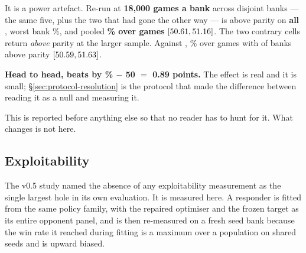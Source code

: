 It is a power artefact. Re-run at \textbf{18{,}000 games a bank} across
\vsixBigFiveBanks{} disjoint banks --- the same five, plus the two that had gone the other way ---
\vsix{} is above parity on \textbf{all \vsixBigFiveAbove{}}, worst bank \vsixBigFiveMin\%, and
pooled \textbf{\vsixBigFive\% over \vsixBigFiveN{} games}
$[50.61, 51.16]$. The two contrary cells return \emph{above} parity at the
larger sample. Against \vfour{}, \vsixBigFour\% over \vsixBigFourN{} games with
\vsixBigFourAbove{} of \vsixBigFourBanks{} banks above parity
$[50.59, 51.63]$.

\begin{table}[t]\centering
\caption{High-power head-to-head against \vfive{}, 3{,}000 deals $\times$ 6 rotations per bank.
Every bank is above parity.}
\label{tab:bighead}

\end{table}

\textbf{Head to head, \vsix{} beats \vfive{} by \vsixBigFive\% $-$ 50 $=$ 0.89 points.} The
effect is real and it is small; \S\ref{sec:protocol-resolution} is the protocol that made the
difference between reading it as a null and measuring it.

\begin{table}[t]\centering
\caption{Held-out head-to-head against \vfive{}, one row per seed bank, six rotations.}
\label{tab:h2h}

\end{table}

This is reported before anything else so that no reader has to hunt for it. What \vsix{} changes is
not here.

\subsection{Exploitability}
\label{sec:results-exploit}

The v0.5 study named the absence of any exploitability measurement as the single largest hole in its
own evaluation. It is measured here. A responder is fitted from the same policy family, with the
repaired optimiser and the frozen target as its entire opponent panel, and is then re-measured on a
fresh seed bank because the win rate it reached during fitting is a maximum over a population on
shared seeds and is upward biased.

\begin{table}[t]\centering
\caption{Local best-response probe. The response win rate is what a fitted exploiter achieved, so
\emph{lower is better} for the frozen policy. The \vfour{} row is the positive control: the v0.4
study published $51.19\%$ $[49.67, 52.72]$ for the same experiment.}
\label{tab:lbr}

\end{table}

